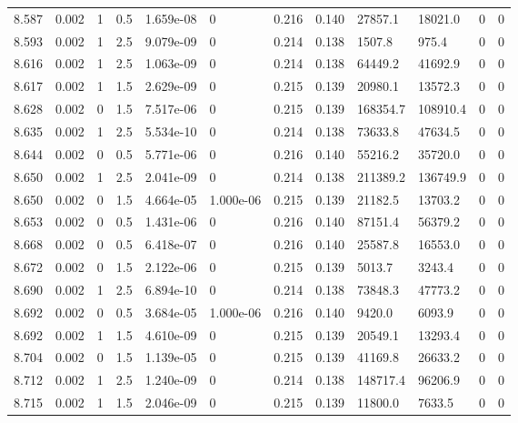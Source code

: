 \documentclass[preview]{standalone}
\begin{document}
{{{{{{{{{{{{{{{\begin{tabular}{L{1.2cm}C{1.2cm} C{0.3cm}C{0.5cm} C{1.4cm}C{1.4cm} C{1.4cm}C{1.4cm} C{1.6cm}C{1.6cm} C{1.6cm}C{1.6cm}}
  8.587  &  0.002  & 1     & 0.5 &  1.659e-08  & 0  &  0.216&   0.140& 27857.1 & 18021.0   &  0 & 0  \\ 
  8.593  &  0.002  & 1     & 2.5 &  9.079e-09  & 0  &  0.214&   0.138& 1507.8 & 975.4   &  0 & 0  \\ 
  8.616  &  0.002  & 1     & 2.5 &  1.063e-09  & 0  &  0.214&   0.138& 64449.2 & 41692.9   &  0 & 0  \\ 
  8.617  &  0.002  & 1     & 1.5 &  2.629e-09  & 0  &  0.215&   0.139& 20980.1 & 13572.3   &  0 & 0  \\ 
  8.628  &  0.002  & 0     & 1.5 &  7.517e-06  & 0  &  0.215&   0.139& 168354.7 & 108910.4   &  0 & 0  \\ 
  8.635  &  0.002  & 1     & 2.5 &  5.534e-10  & 0  &  0.214&   0.138& 73633.8 & 47634.5   &  0 & 0  \\ 
  8.644  &  0.002  & 0     & 0.5 &  5.771e-06  & 0  &  0.216&   0.140& 55216.2 & 35720.0   &  0 & 0  \\ 
  8.650  &  0.002  & 1     & 2.5 &  2.041e-09  & 0  &  0.214&   0.138& 211389.2 & 136749.9   &  0 & 0  \\ 
  8.650  &  0.002  & 0     & 1.5 &  4.664e-05  & 1.000e-06  &  0.215&   0.139& 21182.5 & 13703.2   &  0 & 0  \\ 
  8.653  &  0.002  & 0     & 0.5 &  1.431e-06  & 0  &  0.216&   0.140& 87151.4 & 56379.2   &  0 & 0  \\ 
  8.668  &  0.002  & 0     & 0.5 &  6.418e-07  & 0  &  0.216&   0.140& 25587.8 & 16553.0   &  0 & 0  \\ 
  8.672  &  0.002  & 0     & 1.5 &  2.122e-06  & 0  &  0.215&   0.139& 5013.7 & 3243.4   &  0 & 0  \\ 
  8.690  &  0.002  & 1     & 2.5 &  6.894e-10  & 0  &  0.214&   0.138& 73848.3 & 47773.2   &  0 & 0  \\ 
  8.692  &  0.002  & 0     & 0.5 &  3.684e-05  & 1.000e-06  &  0.216&   0.140& 9420.0 & 6093.9   &  0 & 0  \\ 
  8.692  &  0.002  & 1     & 1.5 &  4.610e-09  & 0  &  0.215&   0.139& 20549.1 & 13293.4   &  0 & 0  \\ 
  8.704  &  0.002  & 0     & 1.5 &  1.139e-05  & 0  &  0.215&   0.139& 41169.8 & 26633.2   &  0 & 0  \\ 
  8.712  &  0.002  & 1     & 2.5 &  1.240e-09  & 0  &  0.214&   0.138& 148717.4 & 96206.9   &  0 & 0  \\ 
  8.715  &  0.002  & 1     & 1.5 &  2.046e-09  & 0  &  0.215&   0.139& 11800.0 & 7633.5   &  0 & 0  \\ 

\end{tabular}}}}}}}}}}}}}}}}
\end{document}
